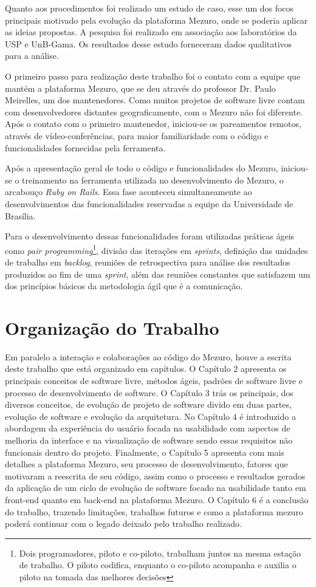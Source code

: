 Quanto aos procedimentos foi realizado um estudo de caso, esse um dos focos principais motivado pela evolução da plataforma Mezuro, onde se poderia aplicar as ideias propostas. A pesquisa foi realizado em associação aos laboratórios da USP e UnB-Gama. Os resultados desse estudo forneceram dados qualitativos para a análise.

O primeiro passo para realização deste trabalho foi o contato com a equipe que mantém a plataforma Mezuro, que se deu através do professor Dr. Paulo Meirelles, um dos mantenedores. Como muitos projetos de software livre contam com desenvolvedores distantes geograficamente, com o Mezuro não foi diferente. Após o contato com o primeiro mantenedor, iniciou-se os pareamentos remotos, através de vídeo-conferências, para maior familiaridade com o código e funcionalidades fornecidas pela ferramenta.

Após a apresentação geral de todo o código e funcionalidades do Mezuro, iniciou-se o treinamento na ferramenta utilizada no desenvolvimento do Mezuro, o arcabouço \textit{Ruby on Rails}. Essa fase aconteceu simultaneamente ao desenvolvimentos das funcionalidades reservadas a equipe da Universidade de Brasília.

Para o desenvolvimento dessas funcionalidades foram utilizadas práticas ágeis como \textit{pair programming}\footnote{Dois programadores, piloto e co-piloto, trabalham juntos na mesma estação de trabalho. O piloto codifica, enquanto o co-piloto acompanha e auxilia o piloto na tomada das melhores decisões}, divisão das iterações em \textit{sprints}, definição das unidades de trabalho em \textit{backlog}, reuniões de retrospectiva para análise dos resultados produzidos ao fim de uma \textit{sprint}, além das reuniões constantes que satisfazem um dos princípios básicos da metodologia ágil que é a comunicação.

\section{Organização do Trabalho}

Em paralelo a interação e colaborações ao código do Mezuro, houve a escrita deste trabalho que está organizado em capítulos. O Capítulo 2 apresenta os principais conceitos de software livre, métodos ágeis, padrões de software livre e processo de desenvolvimento de software. O Capítulo 3 trás os principais, dos diversos conceitos, de evolução de projeto de software divido em duas partes, evolução de software e evolução da arquitetura. No Capítulo 4 é introduzido a abordagem da experiência do usuário focada na usabilidade com aspectos de melhoria da interface e na visualização de software sendo essas requisitos não funcionais dentro do projeto. Finalmente, o Capítulo 5 apresenta com mais detalhes a plataforma Mezuro, seu processo de desenvolvimento, fatores que motivaram a reescrita de seu código, assim como o processo e resultados gerados da aplicação de um ciclo de evolução de software focado na usabilidade tanto em front-end quanto em back-end na plataforma Mezuro. O Capítulo 6 é a conclusão do trabalho, trazendo limitações, trabalhos futuros e como a plataforma mezuro poderá continuar com o legado deixado pelo trabalho realizado.

